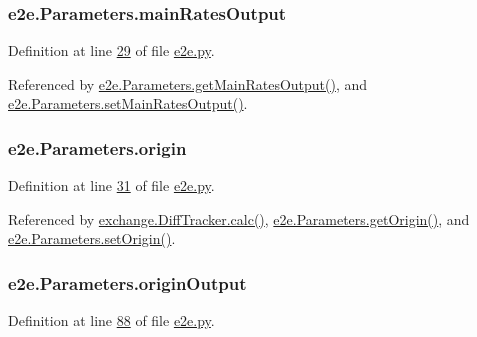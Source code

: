 \subsubsection[{\texorpdfstring{main\+Rates\+Output}{mainRatesOutput}}]{\setlength{\rightskip}{0pt plus 5cm}e2e.\+Parameters.\+main\+Rates\+Output}\hypertarget{classe2e_1_1_parameters_a552470d8541b7caf2bb8940e32a6fe0e}{}\label{classe2e_1_1_parameters_a552470d8541b7caf2bb8940e32a6fe0e}


Definition at line \hyperlink{e2e_8py_source_l00029}{29} of file \hyperlink{e2e_8py_source}{e2e.\+py}.



Referenced by \hyperlink{e2e_8py_source_l00066}{e2e.\+Parameters.\+get\+Main\+Rates\+Output()}, and \hyperlink{e2e_8py_source_l00063}{e2e.\+Parameters.\+set\+Main\+Rates\+Output()}.

\subsubsection[{\texorpdfstring{origin}{origin}}]{\setlength{\rightskip}{0pt plus 5cm}e2e.\+Parameters.\+origin}\hypertarget{classe2e_1_1_parameters_aff4d7aaa35295f7f71e546fe5554c4d9}{}\label{classe2e_1_1_parameters_aff4d7aaa35295f7f71e546fe5554c4d9}


Definition at line \hyperlink{e2e_8py_source_l00031}{31} of file \hyperlink{e2e_8py_source}{e2e.\+py}.



Referenced by \hyperlink{exchange_8py_source_l00272}{exchange.\+Diff\+Tracker.\+calc()}, \hyperlink{e2e_8py_source_l00078}{e2e.\+Parameters.\+get\+Origin()}, and \hyperlink{e2e_8py_source_l00075}{e2e.\+Parameters.\+set\+Origin()}.

\subsubsection[{\texorpdfstring{origin\+Output}{originOutput}}]{\setlength{\rightskip}{0pt plus 5cm}e2e.\+Parameters.\+origin\+Output}\hypertarget{classe2e_1_1_parameters_ab1ac2fc0ab2f3ef169b776c776cdb225}{}\label{classe2e_1_1_parameters_ab1ac2fc0ab2f3ef169b776c776cdb225}


Definition at line \hyperlink{e2e_8py_source_l00088}{88} of file \hyperlink{e2e_8py_source}{e2e.\+py}.



